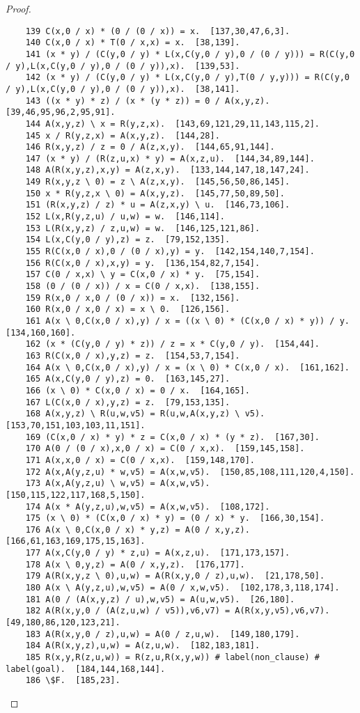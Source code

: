 \documentclass[12pt, twoside, openright]{report}
\theoremstyle{definition}
\begin{document}
\begin{proof}
\begin{lstlisting}
    139 C(x,0 / x) * (0 / (0 / x)) = x.  [137,30,47,6,3].
    140 C(x,0 / x) * T(0 / x,x) = x.  [38,139].
    141 (x * y) / (C(y,0 / y) * L(x,C(y,0 / y),0 / (0 / y))) = R(C(y,0 / y),L(x,C(y,0 / y),0 / (0 / y)),x).  [139,53].
    142 (x * y) / (C(y,0 / y) * L(x,C(y,0 / y),T(0 / y,y))) = R(C(y,0 / y),L(x,C(y,0 / y),0 / (0 / y)),x).  [38,141].
    143 ((x * y) * z) / (x * (y * z)) = 0 / A(x,y,z).  [39,46,95,96,2,95,91].
    144 A(x,y,z) \ x = R(y,z,x).  [143,69,121,29,11,143,115,2].
    145 x / R(y,z,x) = A(x,y,z).  [144,28].
    146 R(x,y,z) / z = 0 / A(z,x,y).  [144,65,91,144].
    147 (x * y) / (R(z,u,x) * y) = A(x,z,u).  [144,34,89,144].
    148 A(R(x,y,z),x,y) = A(z,x,y).  [133,144,147,18,147,24].
    149 R(x,y,z \ 0) = z \ A(z,x,y).  [145,56,50,86,145].
    150 x * R(y,z,x \ 0) = A(x,y,z).  [145,77,50,89,50].
    151 (R(x,y,z) / z) * u = A(z,x,y) \ u.  [146,73,106].
    152 L(x,R(y,z,u) / u,w) = w.  [146,114].
    153 L(R(x,y,z) / z,u,w) = w.  [146,125,121,86].
    154 L(x,C(y,0 / y),z) = z.  [79,152,135].
    155 R(C(x,0 / x),0 / (0 / x),y) = y.  [142,154,140,7,154].
    156 R(C(x,0 / x),x,y) = y.  [136,154,82,7,154].
    157 C(0 / x,x) \ y = C(x,0 / x) * y.  [75,154].
    158 (0 / (0 / x)) / x = C(0 / x,x).  [138,155].
    159 R(x,0 / x,0 / (0 / x)) = x.  [132,156].
    160 R(x,0 / x,0 / x) = x \ 0.  [126,156].
    161 A(x \ 0,C(x,0 / x),y) / x = ((x \ 0) * (C(x,0 / x) * y)) / y.  [134,160,160].
    162 (x * (C(y,0 / y) * z)) / z = x * C(y,0 / y).  [154,44].
    163 R(C(x,0 / x),y,z) = z.  [154,53,7,154].
    164 A(x \ 0,C(x,0 / x),y) / x = (x \ 0) * C(x,0 / x).  [161,162].
    165 A(x,C(y,0 / y),z) = 0.  [163,145,27].
    166 (x \ 0) * C(x,0 / x) = 0 / x.  [164,165].
    167 L(C(x,0 / x),y,z) = z.  [79,153,135].
    168 A(x,y,z) \ R(u,w,v5) = R(u,w,A(x,y,z) \ v5).  [153,70,151,103,103,11,151].
    169 (C(x,0 / x) * y) * z = C(x,0 / x) * (y * z).  [167,30].
    170 A(0 / (0 / x),x,0 / x) = C(0 / x,x).  [159,145,158].
    171 A(x,x,0 / x) = C(0 / x,x).  [159,148,170].
    172 A(x,A(y,z,u) * w,v5) = A(x,w,v5).  [150,85,108,111,120,4,150].
    173 A(x,A(y,z,u) \ w,v5) = A(x,w,v5).  [150,115,122,117,168,5,150].
    174 A(x * A(y,z,u),w,v5) = A(x,w,v5).  [108,172].
    175 (x \ 0) * (C(x,0 / x) * y) = (0 / x) * y.  [166,30,154].
    176 A(x \ 0,C(x,0 / x) * y,z) = A(0 / x,y,z).  [166,61,163,169,175,15,163].
    177 A(x,C(y,0 / y) * z,u) = A(x,z,u).  [171,173,157].
    178 A(x \ 0,y,z) = A(0 / x,y,z).  [176,177].
    179 A(R(x,y,z \ 0),u,w) = A(R(x,y,0 / z),u,w).  [21,178,50].
    180 A(x \ A(y,z,u),w,v5) = A(0 / x,w,v5).  [102,178,3,118,174].
    181 A(0 / (A(x,y,z) / u),w,v5) = A(u,w,v5).  [26,180].
    182 A(R(x,y,0 / (A(z,u,w) / v5)),v6,v7) = A(R(x,y,v5),v6,v7).  [49,180,86,120,123,21].
    183 A(R(x,y,0 / z),u,w) = A(0 / z,u,w).  [149,180,179].
    184 A(R(x,y,z),u,w) = A(z,u,w).  [182,183,181].
    185 R(x,y,R(z,u,w)) = R(z,u,R(x,y,w)) # label(non_clause) # label(goal).  [184,144,168,144].
    186 \$F.  [185,23].
  \end{lstlisting}
\end{proof}


\end{document}
